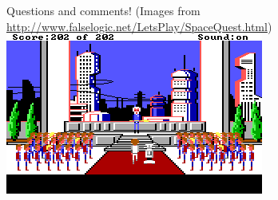\documentclass{beamer}
\begin{document}
\begin{frame}{Questions and comments!}
  \footnotesize
  (Images from \url{http://www.falselogic.net/LetsPlay/SpaceQuest.html})
  \includegraphics[width=\linewidth]{sq_final}
\end{frame}
\end{document}
